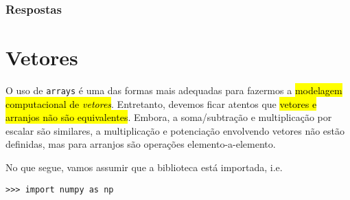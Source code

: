 \ifisbook
\subsubsection{Respostas}
\shipoutAnswer
\fi


\section{Vetores}\label{cap_arr_sec_vetor}

O uso de \lstinline+arrays+ é uma das formas mais adequadas para fazermos a \hl{modelagem computacional de \emph{vetores}}. Entretanto, devemos ficar atentos que \hl{vetores e arranjos não são equivalentes}. Embora, a soma/subtração e multiplicação por escalar são similares, a multiplicação e potenciação envolvendo vetores não estão definidas, mas para arranjos são operações elemento-a-elemento.

No que segue, vamos assumir que a biblioteca {\numpy} está importada, i.e.

\begin{lstlisting}
>>> import numpy as np
\end{lstlisting}

